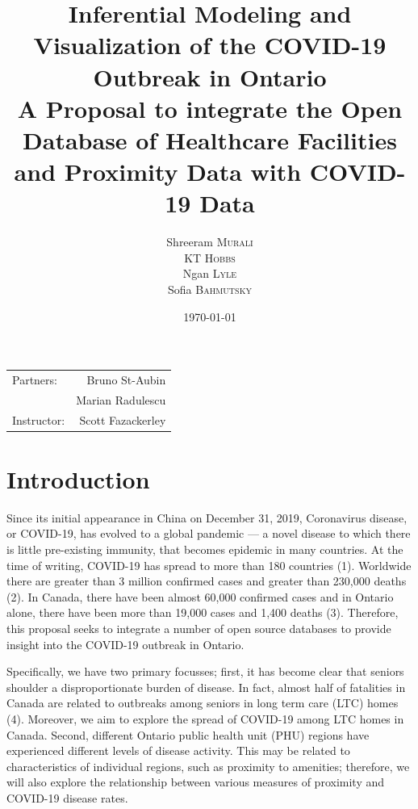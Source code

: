 \documentclass{article}
\title{Inferential Modeling and Visualization of the COVID-19 Outbreak in Ontario \\ 
		\large A Proposal to integrate the Open Database of Healthcare Facilities and Proximity Data with COVID-19 Data}
\author{Shreeram \textsc{Murali} \\ KT \textsc{Hobbs} \\ Ngan \textsc{Lyle} \\ Sofia \textsc{Bahmutsky}}
\date{\today} %
\begin{document}
\maketitle %

\begin{center}
\begin{tabular}{l r}
Partners: & Bruno St-Aubin \\ %
& Marian Radulescu \\
Instructor: & Scott Fazackerley %
\end{tabular}
\end{center}



\section{Introduction}
Since its initial appearance in China on December 31, 2019, Coronavirus disease, or COVID-19, has evolved to a global pandemic --- a novel disease to which there is little pre-existing immunity, that becomes epidemic in many countries. At the time of writing, COVID-19 has spread to more than 180 countries (1). Worldwide there are greater than 3 million confirmed cases and greater than 230,000 deaths (2). In Canada, there have been almost 60,000 confirmed cases and in Ontario alone, there have been more than 19,000 cases and 1,400 deaths (3). Therefore, this proposal seeks to integrate a number of open source databases to provide insight into the COVID-19 outbreak in Ontario. 

Specifically, we have two primary focusses; first, it has become clear that seniors shoulder a disproportionate burden of disease. In fact, almost half of fatalities in Canada are related to outbreaks among seniors in long term care (LTC) homes (4). Moreover, we aim to explore the spread of COVID-19 among LTC homes in Canada. Second, different Ontario public health unit (PHU) regions have experienced different levels of disease activity. This may be related to characteristics of individual regions, such as proximity to amenities; therefore, we will also explore the relationship between various measures of proximity and COVID-19 disease rates. 
\end{document}
